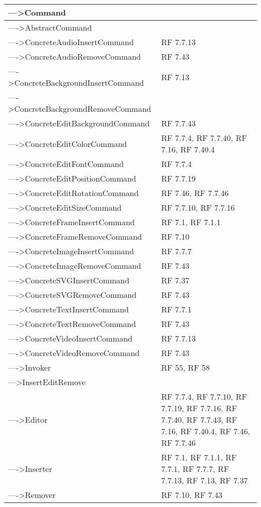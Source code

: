 {\begin{longtable} [c]{| p{8cm} | p{5cm} |}
 \hline 
--->Command & \\ 
 \hline 
---->AbstractCommand & \\ 
 \hline 
---->ConcreteAudioInsertCommand & RF 7.7.13\\ 
 \hline 
---->ConcreteAudioRemoveCommand & RF 7.43\\ 
 \hline 
---->ConcreteBackgroundInsertCommand & RF 7.13\\ 
 \hline 
---->ConcreteBackgroundRemoveCommand & \\ 
 \hline 
---->ConcreteEditBackgroundCommand & RF 7.7.43\\ 
 \hline 
---->ConcreteEditColorCommand & RF 7.7.4, RF 7.7.40, RF 7.16, RF 7.40.4\\ 
 \hline 
---->ConcreteEditFontCommand & RF 7.7.4\\ 
 \hline 
---->ConcreteEditPositionCommand & RF 7.7.19\\ 
 \hline 
---->ConcreteEditRotationCommand & RF 7.46, RF 7.7.46\\ 
 \hline 
---->ConcreteEditSizeCommand & RF 7.7.10, RF 7.7.16\\ 
 \hline 
---->ConcreteFrameInsertCommand & RF 7.1, RF 7.1.1\\ 
 \hline 
---->ConcreteFrameRemoveCommand & RF 7.10\\ 
 \hline 
---->ConcreteImageInsertCommand & RF 7.7.7\\ 
 \hline 
---->ConcreteImageRemoveCommand & RF 7.43\\ 
 \hline 
---->ConcreteSVGInsertCommand & RF 7.37\\ 
 \hline 
---->ConcreteSVGRemoveCommand & RF 7.43\\ 
 \hline 
---->ConcreteTextInsertCommand & RF 7.7.1\\ 
 \hline 
---->ConcreteTextRemoveCommand & RF 7.43\\ 
 \hline 
---->ConcreteVideoInsertCommand & RF 7.7.13\\ 
 \hline 
---->ConcreteVideoRemoveCommand & RF 7.43\\ 
 \hline 
---->Invoker & RF 55, RF 58\\ 
 \hline 
--->InsertEditRemove & \\ 
 \hline 
---->Editor & RF 7.7.4, RF 7.7.10, RF 7.7.19, RF 7.7.16, RF 7.7.40, RF 7.7.43, RF 7.16, RF 7.40.4, RF 7.46, RF 7.7.46\\ 
 \hline 
---->Inserter & RF 7.1, RF 7.1.1, RF 7.7.1, RF 7.7.7, RF 7.7.13, RF 7.13, RF 7.37\\ 
 \hline 
---->Remover & RF 7.10, RF 7.43\\ 

\end{longtable}}
